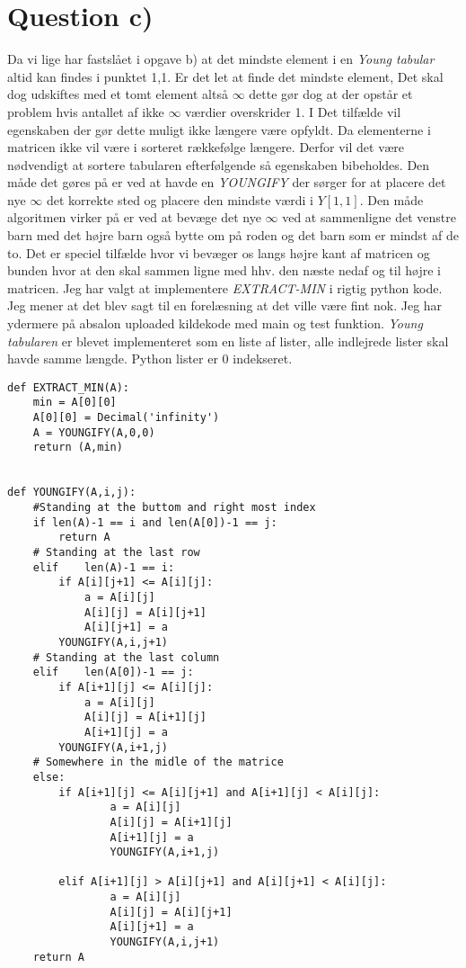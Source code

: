 \documentclass[a4paper, 12pt]{article}
\begin{document}
\section*{Question c)}
Da vi lige har fastslået i opgave b) at det mindste element i en \emph{Young tabular} altid kan 
findes i punktet 1,1. Er det let at finde det mindste element, Det skal dog udskiftes med et tomt
element altså $\infty$ dette gør dog at der opstår et problem hvis antallet af ikke $\infty$ værdier
overskrider 1. I Det tilfælde vil egenskaben der gør dette muligt ikke længere være opfyldt.
Da elementerne i matricen ikke vil være i sorteret rækkefølge længere. Derfor vil
det være nødvendigt at sortere tabularen efterfølgende så egenskaben bibeholdes.
Den måde det gøres på er ved at havde en \emph{YOUNGIFY} der sørger for at placere det nye $\infty$ det
korrekte sted og placere den mindste værdi i $Y[1,1]$. Den måde algoritmen virker på er ved
at bevæge det nye $\infty$ ved at sammenligne det venstre barn med det højre barn også bytte om på
roden og det barn som er mindst af de to. Det er speciel tilfælde hvor vi bevæger os langs højre kant
af matricen og bunden hvor at den skal sammen ligne med hhv. den næste nedaf og til højre i matricen.
Jeg har valgt at implementere \emph{EXTRACT-MIN} i rigtig python kode. Jeg mener at det blev sagt til en forelæsning at 
det ville være fint nok. Jeg har ydermere på absalon uploaded kildekode med main og test funktion.
\emph{Young tabularen} er blevet implementeret som en liste af lister, alle indlejrede lister skal havde samme længde.
Python lister er 0 indekseret.
\label{Python kode til EXTRACT-MIN funktion på young tabulars}
\begin{lstlisting}
def EXTRACT_MIN(A):
	min = A[0][0]
	A[0][0] = Decimal('infinity')
	A = YOUNGIFY(A,0,0)
	return (A,min)


def YOUNGIFY(A,i,j):
	#Standing at the buttom and right most index
	if len(A)-1 == i and len(A[0])-1 == j:
		return A
	# Standing at the last row
	elif	len(A)-1 == i:
		if A[i][j+1] <= A[i][j]:
			a = A[i][j]
			A[i][j] = A[i][j+1]
			A[i][j+1] = a
		YOUNGIFY(A,i,j+1)
	# Standing at the last column
	elif	len(A[0])-1 == j:
		if A[i+1][j] <= A[i][j]:
			a = A[i][j]
			A[i][j] = A[i+1][j]
			A[i+1][j] = a
		YOUNGIFY(A,i+1,j)
	# Somewhere in the midle of the matrice
	else:
		if A[i+1][j] <= A[i][j+1] and A[i+1][j] < A[i][j]:
				a = A[i][j]
				A[i][j] = A[i+1][j]
				A[i+1][j] = a
				YOUNGIFY(A,i+1,j)
		
		elif A[i+1][j] > A[i][j+1] and A[i][j+1] < A[i][j]:
				a = A[i][j]
				A[i][j] = A[i][j+1]
				A[i][j+1] = a
				YOUNGIFY(A,i,j+1)		 
	return A
\end{lstlisting}
\end{document}

